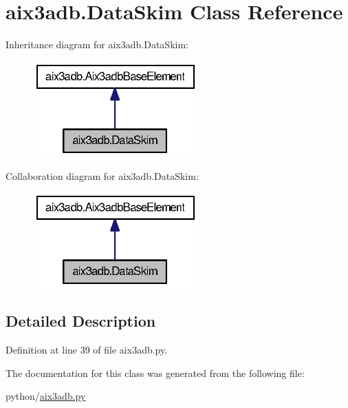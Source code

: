 \section{aix3adb.\-Data\-Skim Class Reference}
\label{classaix3adb_1_1DataSkim}


Inheritance diagram for aix3adb.\-Data\-Skim\-:
\nopagebreak
\begin{figure}[H]
\begin{center}
\leavevmode
\includegraphics[width=180pt]{classaix3adb_1_1DataSkim__inherit__graph}
\end{center}
\end{figure}


Collaboration diagram for aix3adb.\-Data\-Skim\-:
\nopagebreak
\begin{figure}[H]
\begin{center}
\leavevmode
\includegraphics[width=180pt]{classaix3adb_1_1DataSkim__coll__graph}
\end{center}
\end{figure}


\subsection{Detailed Description}


Definition at line 39 of file aix3adb.\-py.



The documentation for this class was generated from the following file\-:\begin{DoxyCompactItemize}
\item 
python/\hyperlink{aix3adb_8py}{aix3adb.\-py}\end{DoxyCompactItemize}
